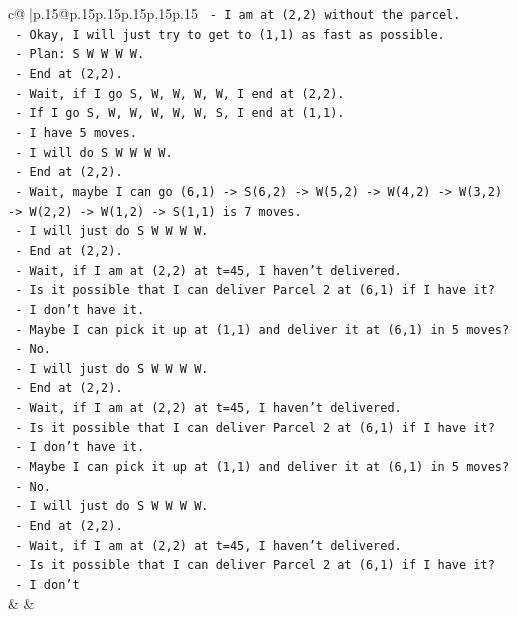 \documentclass{article}
\begin{document}
{\begin{supertabular}{c@{$\;$}|p{.15\linewidth}@{}p{.15\linewidth}p{.15\linewidth}p{.15\linewidth}p{.15\linewidth}p{.15\linewidth}}
{{{\texttt{      {-} I am at (2,2) without the parcel.} \\
\texttt{      {-} Okay, I will just try to get to (1,1) as fast as possible.} \\
\texttt{      {-} Plan: S W W W W.} \\
\texttt{      {-} End at (2,2).} \\
\texttt{      {-} Wait, if I go S, W, W, W, W, I end at (2,2).} \\
\texttt{      {-} If I go S, W, W, W, W, W, S, I end at (1,1).} \\
\texttt{      {-} I have 5 moves.} \\
\texttt{      {-} I will do S W W W W.} \\
\texttt{      {-} End at (2,2).} \\
\texttt{      {-} Wait, maybe I can go (6,1) {-}> S(6,2) {-}> W(5,2) {-}> W(4,2) {-}> W(3,2) {-}> W(2,2) {-}> W(1,2) {-}> S(1,1) is 7 moves.} \\
\texttt{      {-} I will just do S W W W W.} \\
\texttt{      {-} End at (2,2).} \\
\texttt{      {-} Wait, if I am at (2,2) at t=45, I haven't delivered.} \\
\texttt{      {-} Is it possible that I can deliver Parcel 2 at (6,1) if I have it?} \\
\texttt{      {-} I don't have it.} \\
\texttt{      {-} Maybe I can pick it up at (1,1) and deliver it at (6,1) in 5 moves?} \\
\texttt{      {-} No.} \\
\texttt{      {-} I will just do S W W W W.} \\
\texttt{      {-} End at (2,2).} \\
\texttt{      {-} Wait, if I am at (2,2) at t=45, I haven't delivered.} \\
\texttt{      {-} Is it possible that I can deliver Parcel 2 at (6,1) if I have it?} \\
\texttt{      {-} I don't have it.} \\
\texttt{      {-} Maybe I can pick it up at (1,1) and deliver it at (6,1) in 5 moves?} \\
\texttt{      {-} No.} \\
\texttt{      {-} I will just do S W W W W.} \\
\texttt{      {-} End at (2,2).} \\
\texttt{      {-} Wait, if I am at (2,2) at t=45, I haven't delivered.} \\
\texttt{      {-} Is it possible that I can deliver Parcel 2 at (6,1) if I have it?} \\
\texttt{      {-} I don't} \\
            }
        }
    }
    & & \\ \\


\end{supertabular}}
\end{document}
